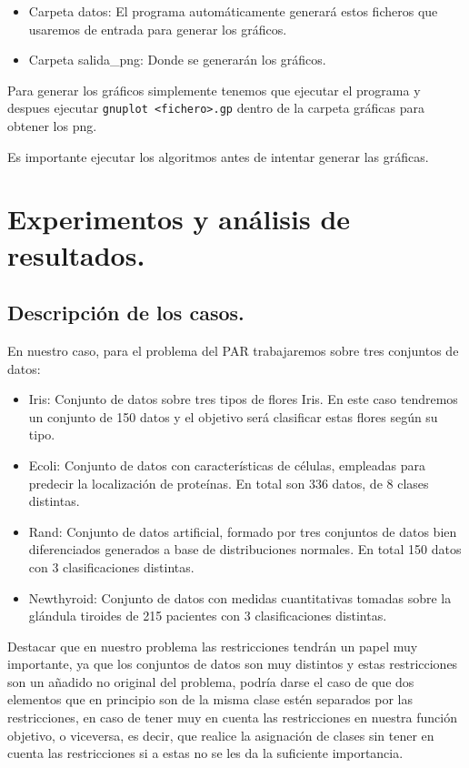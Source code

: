 \documentclass[12pt, spanish]{article}
\begin{document}
\begin{itemize}
	\item Carpeta datos: El programa automáticamente generará estos ficheros que usaremos de entrada para generar los gráficos.
	\item Carpeta salida\_png: Donde se generarán los gráficos.
\end{itemize}

Para generar los gráficos simplemente tenemos que ejecutar el programa y despues ejecutar \texttt{gnuplot <fichero>.gp} dentro de la carpeta gráficas para obtener los png.


Es importante ejecutar los algoritmos antes de intentar generar las gráficas.

\newpage




\section{Experimentos y análisis de resultados.}


\subsection{Descripción de los casos.}

En nuestro caso, para el problema del PAR trabajaremos sobre tres conjuntos de datos:

\begin{itemize}
	\item{Iris: Conjunto de datos sobre tres tipos de flores Iris. En este caso tendremos un conjunto de 150 datos y el objetivo será clasificar estas flores según su tipo.}
	\item{Ecoli: Conjunto de datos con características de células, empleadas para predecir la localización de proteínas. En total son 336 datos, de 8 clases distintas.}
	\item{Rand: Conjunto de datos artificial, formado por tres conjuntos de datos bien diferenciados generados a base de distribuciones normales. En total 150 datos con 3 clasificaciones distintas.}
	\item{Newthyroid: Conjunto de datos con medidas cuantitativas tomadas sobre la glándula tiroides de 215 pacientes con 3 clasificaciones distintas.}
\end{itemize}

Destacar que en nuestro problema las restricciones tendrán un papel muy importante, ya que los conjuntos de datos son muy distintos y estas restricciones son un añadido no original del problema, podría darse el caso de que dos elementos que en principio son de la misma clase estén separados por las restricciones, en caso de tener muy en cuenta las restricciones en nuestra función objetivo, o viceversa, es decir, que realice la asignación de clases sin tener en cuenta las restricciones si a estas no se les da la suficiente importancia.
\end{document}
